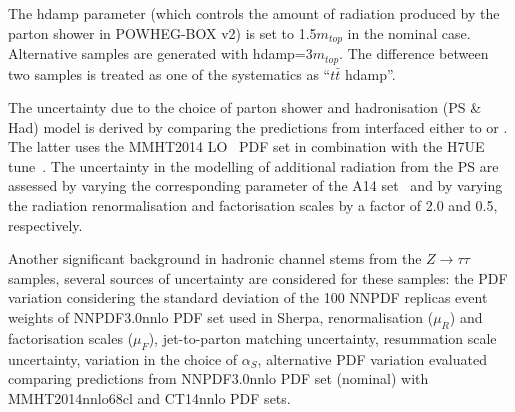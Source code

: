 The hdamp parameter (which controls the amount of radiation produced by the parton shower in
POWHEG-BOX v2) is set to 1.5$m_{top}$ in the nominal case. Alternative samples are generated with hdamp=3$m_{top}$. The
difference between two samples is treated as one of the systematics as ``$t\bar{t}$ hdamp''. 

The uncertainty due to the choice of parton shower and hadronisation (PS \& Had) model is derived 
by comparing the predictions from {\powheg} interfaced either to {\pythiaeight} or {}.
The latter uses the MMHT2014 LO~\cite{Harland-Lang:2014zoa} PDF set in combination with the H7UE tune~\cite{Bellm:2015jjp}.
The uncertainty in the modelling of additional radiation from the PS are assessed by
varying the corresponding parameter of the A14 set~\cite{ATL-PHYS-PUB-2016-004} and by varying the radiation renormalisation and factorisation scales
by a factor of 2.0 and 0.5, respectively. 


Another significant background in hadronic channel stems from the $Z\rightarrow \tau\tau$ samples, several sources of uncertainty are
considered for these samples: the PDF variation considering the standard deviation of the 100 NNPDF replicas event weights of NNPDF3.0nnlo PDF
set used in Sherpa, renormalisation ($\mu_{R}$) and factorisation scales ($\mu_{F}$), jet-to-parton matching uncertainty, resummation scale uncertainty,
variation in the choice of $\alpha_{S}$, alternative PDF variation evaluated comparing predictions from NNPDF3.0nnlo PDF set (nominal)
with MMHT2014nnlo68cl and CT14nnlo PDF sets.

